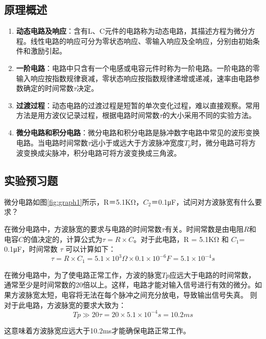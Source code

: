 \documentclass[dvipsnames, svgnames,a4paper,11pt]{article}
\begin{document}
	\subsection{原理概述}
	\begin{enumerate}
		\item \textbf{动态电路及响应}：含有L、C元件的电路称为动态电路，其描述方程为微分方程。线性电路的响应可分为零状态响应、零输入响应及全响应，分别由初始条件和激励引起。

		\item \textbf{一阶电路}：电路中只含有一个电感或电容元件时称为一阶电路。一阶电路的零输入响应按指数规律衰减，零状态响应按指数规律递增或递减，速率由电路参数确定的时间常数$\tau$决定。
		
		\item \textbf{过渡过程}：动态电路的过渡过程是短暂的单次变化过程，难以直接观察。常用方法是用方波仪记录过程，根据电路时间常数$\tau$的大小采用不同的实验方法。
		
		\item \textbf{微分电路和积分电路}：微分电路和积分电路是脉冲数字电路中常见的波形变换电路。当电路时间常数$\tau$远小于或远大于方波脉冲宽度$T_p$时，微分电路可将方波变换成尖脉冲，积分电路可将方波变换成三角波。
	\end{enumerate}
	
	\subsection{实验预习题}
	
	\begin{question}
		微分电路如图\ref*{fig:graph1}所示，R＝5.1KΩ，$C_2$＝0.1μF，试问对方波脉宽有什么要求？
	\end{question}



		在微分电路中，方波脉宽的要求与电路的时间常数$\tau$有关。时间常数是由电阻$R$和电容$C$的值决定的，计算公式为$ \tau = R \times C$。对于此电路，R = 5.1KΩ 和 $C_1$​ = 0.1μF，时间常数 $\tau$ 可以计算如下：
		\[
			\tau=R\times C_1​=5.1\times10^3\Omega×0.1×10^{−6}F=5.1×10^{−4}s
		\]
		
		在微分电路中，为了使电路正常工作，方波的脉宽$Tp$应远大于电路的时间常数，通常至少是时间常数的20倍以上。这样，电路才能对输入信号进行有效的微分。如果方波脉宽太短，电容将无法在每个脉冲之间充分放电，导致输出信号失真。
		则对于此电路，方波脉宽的要求大致为：
		\[
			Tp\gg20\tau=20×5.1×10^{−4}s=10.2ms
		\]
		
		这意味着方波脉宽应远大于10.2ms才能确保电路正常工作。
\end{document}
